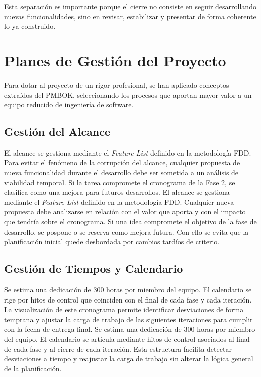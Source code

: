 Esta separación es importante porque el cierre no consiste en seguir desarrollando nuevas funcionalidades, sino en revisar, estabilizar y presentar de forma coherente lo ya construido.

\section{Planes de Gestión del Proyecto}
Para dotar al proyecto de un rigor profesional, se han aplicado conceptos extraídos del PMBOK, seleccionando los procesos que aportan mayor valor a un equipo reducido de ingeniería de software.

\subsection{Gestión del Alcance}
El alcance se gestiona mediante el \textit{Feature List} definido en la metodología FDD. Para evitar el fenómeno de la corrupción del alcance, cualquier propuesta de nueva funcionalidad durante el desarrollo debe ser sometida a un análisis de viabilidad temporal. Si la tarea compromete el cronograma de la Fase 2, se clasifica como una mejora para futuros desarrollos.
El alcance se gestiona mediante el \textit{Feature List} definido en la metodología FDD. Cualquier nueva propuesta debe analizarse en relación con el valor que aporta y con el impacto que tendría sobre el cronograma. Si una idea compromete el objetivo de la fase de desarrollo, se pospone o se reserva como mejora futura. Con ello se evita que la planificación inicial quede desbordada por cambios tardíos de criterio.

\subsection{Gestión de Tiempos y Calendario}
Se estima una dedicación de 300 horas por miembro del equipo. El calendario se rige por hitos de control que coinciden con el final de cada fase y cada iteración. La visualización de este cronograma permite identificar desviaciones de forma temprana y ajustar la carga de trabajo de las siguientes iteraciones para cumplir con la fecha de entrega final.
Se estima una dedicación de 300 horas por miembro del equipo. El calendario se articula mediante hitos de control asociados al final de cada fase y al cierre de cada iteración. Esta estructura facilita detectar desviaciones a tiempo y reajustar la carga de trabajo sin alterar la lógica general de la planificación.

